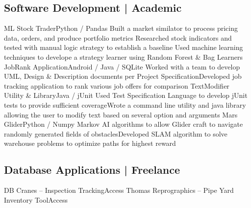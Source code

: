\subsection{Software Development | Academic}
%
\justifiedsubsection%
{ML Stock Trader}{Python / Pandas}
%
\workitems%
{Built a market similator to process pricing data, orders, and produce portfolio metrics}
{Researched stock indicators and tested with manual logic strategy to establish a baseline}
{Used machine learning techniques to develope a strategy learner using Random Forest \& Bag Learners}
%
\justifiedsubsection%
{JobRank Application}{Android / Java / SQLite}
%
\workitemstwo%
{Worked with a team to develop UML, Design \& Description documents per Project Specification}{Developed job tracking application to rank various job offers for comparison}
%
\justifiedsubsection%
{TextModifier Utility \& Library}{Java / jUnit}
%
\workitemstwo%
{Used Test Specification Language to develop jUnit tests to provide sufficient coverage}{Wrote a command line utility and java library allowing the user to modify text based on several option and arguments}
%
\justifiedsubsection%
{Mars Glider}{Python / Numpy}
%
\workitemstwo%
{Markov AI algorithms to allow Glider craft to navigate randomly generated fields of obstacles}{Developed SLAM algorithm to solve warehouse problems to optimize paths for highest reward}
%
%
%
\subsection{Database Applications | Freelance}
%
\justifiedsubsection%
{DB Cranes -- Inspection Tracking}{Access}
%
\justifiedsubsection%
{Thomas Reprographics -- Pipe Yard Inventory Tool}{Access}
